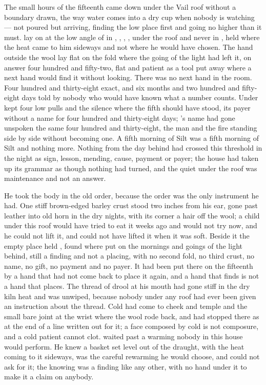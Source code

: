 
The small hours of the fifteenth came down under the Vail roof without a boundary drawn, the way water comes into a dry cup when nobody is watching --- not poured but arriving, finding the low place first and going no higher than it must.  lay on  at the low angle of  in , , , , under the roof and never in , held where the heat came to him sideways and not where he would have chosen. The hand outside the wool lay flat on the fold where the going of the light had left it, on answer four hundred and fifty-two, flat and patient as a tool put away where a next hand would find it without looking. There was no next hand in the room. Four hundred and thirty-eight exact, and six months and two hundred and fifty-eight days told by nobody who would have known what a number counts. Under   kept four low pulls and the silence where the fifth should have stood, its payer without a name for four hundred and thirty-eight days; 's name had gone unspoken the same four hundred and thirty-eight, the man and the fire standing side by side without becoming one. A fifth morning of Silt was a fifth morning of Silt and nothing more. Nothing from the day behind had crossed this threshold in the night as sign, lesson, mending, cause, payment or payer; the house had taken up its grammar as though nothing had turned, and the quiet under the roof was maintenance and not an answer.

He took the body in the old order, because the order was the only instrument he had. One stiff brown-edged barley crust stood two inches from his ear, gone past leather into old horn in the dry nights, with its corner a hair off the wool; a child under this roof would have tried to eat it weeks ago and would not try now, and he could not lift it, and could not have lifted it when it was soft. Beside it the empty place held , found where put on the mornings and goings of the light behind, still a finding and not a placing, with no second fold, no third crust, no name, no gift, no payment and no payer. It had been put there on the fifteenth by a hand that had not come back to place it again, and a hand that finds is not a hand that places. The thread of drool at his mouth had gone stiff in the dry kiln heat and was unwiped, because nobody under any roof had ever been given an instruction about the thread. Cold had come to cheek and temple and the small bare joint at the wrist where the wool rode back, and had stopped there as at the end of a line written out for it; a face composed by cold is not composure, and a cold patient cannot clot.  waited past a warming nobody in this house would perform. He knew a basket set level out of the draught, with the heat coming to it sideways, was the careful rewarming he would choose, and could not ask for it; the knowing was a finding like any other, with no hand under it to make it a claim on anybody.

